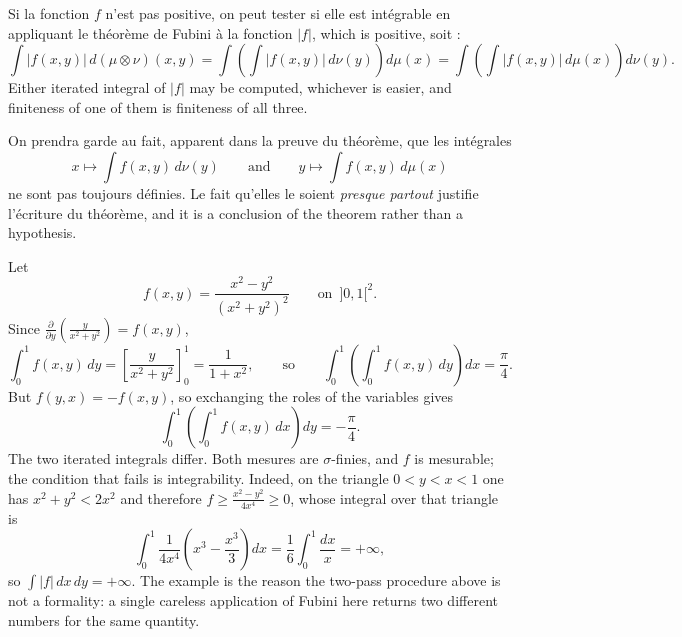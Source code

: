 \begin{remark}
  Si la fonction $f$ n'est pas positive, on peut tester si elle est intégrable en
  appliquant le théorème de Fubini à la fonction $|f|$, which is positive, soit :
  \[
    \int |f(x,y)| \, d(\mu \otimes \nu)(x,y)
    = \int \left( \int |f(x,y)| \, d\nu(y) \right) d\mu(x)
    = \int \left( \int |f(x,y)| \, d\mu(x) \right) d\nu(y) .
  \]
  Either iterated integral of $|f|$ may be computed, whichever is easier, and
  finiteness of one of them is finiteness of all three.
\end{remark}

\begin{remark}
  On prendra garde au fait, apparent dans la preuve du théorème, que les intégrales
  \[
    x \mapsto \int f(x,y) \, d\nu(y)
    \qquad \text{and} \qquad
    y \mapsto \int f(x,y) \, d\mu(x)
  \]
  ne sont pas toujours définies. Le fait qu'elles le soient \emph{presque partout}
  justifie l'écriture du théorème, and it is a conclusion of the theorem rather than
  a hypothesis.
\end{remark}

\begin{example}
  Let
  \[
    f(x,y) = \frac{x^{2} - y^{2}}{(x^{2} + y^{2})^{2}}
    \qquad \text{on } \, ]0,1[^{2} .
  \]
  Since $\frac{\partial}{\partial y} \left( \frac{y}{x^{2}+y^{2}} \right) = f(x,y)$,
  \[
    \int_{0}^{1} f(x,y) \, dy = \left[ \frac{y}{x^{2}+y^{2}} \right]_{0}^{1}
    = \frac{1}{1+x^{2}} ,
    \qquad \text{so} \qquad
    \int_{0}^{1} \left( \int_{0}^{1} f(x,y) \, dy \right) dx = \frac{\pi}{4} .
  \]
  But $f(y,x) = -f(x,y)$, so exchanging the roles of the variables gives
  \[
    \int_{0}^{1} \left( \int_{0}^{1} f(x,y) \, dx \right) dy = -\frac{\pi}{4} .
  \]
  The two iterated integrals differ. Both mesures are $\sigma$-finies, and $f$ is
  mesurable; the condition that fails is integrability. Indeed, on the triangle $0 <
  y < x < 1$ one has $x^{2} + y^{2} < 2x^{2}$ and therefore $f \geq
  \frac{x^{2}-y^{2}}{4x^{4}} \geq 0$, whose integral over that triangle is
  \[
    \int_{0}^{1} \frac{1}{4x^{4}} \left( x^{3} - \frac{x^{3}}{3} \right) dx
    = \frac{1}{6} \int_{0}^{1} \frac{dx}{x} = +\infty ,
  \]
  so $\int |f| \, dx \, dy = +\infty$. The example is the reason
  the two-pass procedure above is not a formality: a single careless application of
  Fubini here returns two different numbers for the same quantity.
\end{example}

